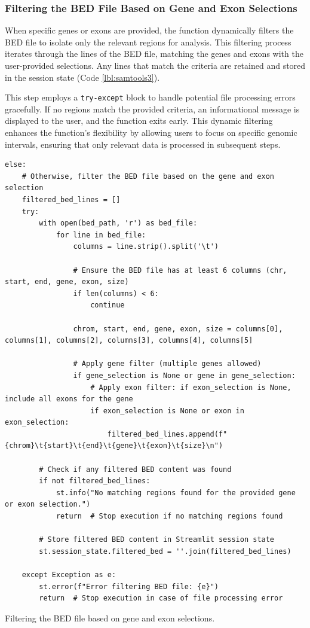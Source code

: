 \subsubsection{\textbf{Filtering the BED File Based on Gene and Exon Selections}}

When specific genes or exons are provided, the function dynamically filters the BED file to isolate only the relevant regions for analysis. This filtering process iterates through the lines of the BED file, matching the genes and exons with the user-provided selections. Any lines that match the criteria are retained and stored in the session state (Code \ref{lbl:samtools3}).

This step employs a \texttt{try-except} block to handle potential file processing errors gracefully. If no regions match the provided criteria, an informational message is displayed to the user, and the function exits early. This dynamic filtering enhances the function's flexibility by allowing users to focus on specific genomic intervals, ensuring that only relevant data is processed in subsequent steps.

\begin{longlisting}
\begin{verbatim}
else:
    # Otherwise, filter the BED file based on the gene and exon selection
    filtered_bed_lines = []
    try:
        with open(bed_path, 'r') as bed_file:
            for line in bed_file:
                columns = line.strip().split('\t')

                # Ensure the BED file has at least 6 columns (chr, start, end, gene, exon, size)
                if len(columns) < 6:
                    continue

                chrom, start, end, gene, exon, size = columns[0], columns[1], columns[2], columns[3], columns[4], columns[5]

                # Apply gene filter (multiple genes allowed)
                if gene_selection is None or gene in gene_selection:
                    # Apply exon filter: if exon_selection is None, include all exons for the gene
                    if exon_selection is None or exon in exon_selection:
                        filtered_bed_lines.append(f"{chrom}\t{start}\t{end}\t{gene}\t{exon}\t{size}\n")

        # Check if any filtered BED content was found
        if not filtered_bed_lines:
            st.info("No matching regions found for the provided gene or exon selection.")
            return  # Stop execution if no matching regions found

        # Store filtered BED content in Streamlit session state
        st.session_state.filtered_bed = ''.join(filtered_bed_lines)

    except Exception as e:
        st.error(f"Error filtering BED file: {e}")
        return  # Stop execution in case of file processing error
\end{verbatim}
\caption{Filtering the BED file based on gene and exon selections.}
\label{lbl:samtools3}
\end{longlisting}

